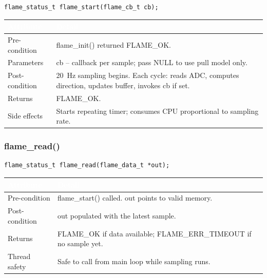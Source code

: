 \documentclass[12pt,a4paper]{article}
\newcommand{\theadtext}[1]{\textcolor{white}{\textbf{#1}}}
\newcommand{\fn}[1]{{\footnotesize\ttfamily #1}}
\begin{document}
\begin{lstlisting}[caption={Signature}]
flame_status_t flame_start(flame_cb_t cb);
\end{lstlisting}

\begin{table}[H]\centering\small
\begin{tabularx}{\textwidth}{L{3cm} X}
\toprule
{}\theadtext{Attribute} & \theadtext{Detail} \\
\midrule
{}   Pre-condition  & \fn{flame\_init()} returned \fn{FLAME\_OK}. \\
 Parameters     & \fn{cb} -- callback per sample; pass \fn{NULL} to use pull model only. \\
   Post-condition & 20~Hz sampling begins. Each cycle: reads ADC, computes direction, updates buffer, invokes \fn{cb} if set. \\
 Returns        & \fn{FLAME\_OK}. \\
   Side effects   & Starts repeating timer; consumes CPU proportional to sampling rate. \\
\bottomrule
\end{tabularx}
\end{table}

\subsubsection{\fn{flame\_read()}}

\begin{lstlisting}[caption={Signature}]
flame_status_t flame_read(flame_data_t *out);
\end{lstlisting}

\begin{table}[H]\centering\small
\begin{tabularx}{\textwidth}{L{3cm} X}
\toprule
{}\theadtext{Attribute} & \theadtext{Detail} \\
\midrule
{}   Pre-condition  & \fn{flame\_start()} called. \fn{out} points to valid memory. \\
 Post-condition & \fn{*out} populated with the latest sample. \\
   Returns        & \fn{FLAME\_OK} if data available; \fn{FLAME\_ERR\_TIMEOUT} if no sample yet. \\
 Thread safety  & Safe to call from main loop while sampling runs. \\
\bottomrule
\end{tabularx}
\end{table}
\end{document}
